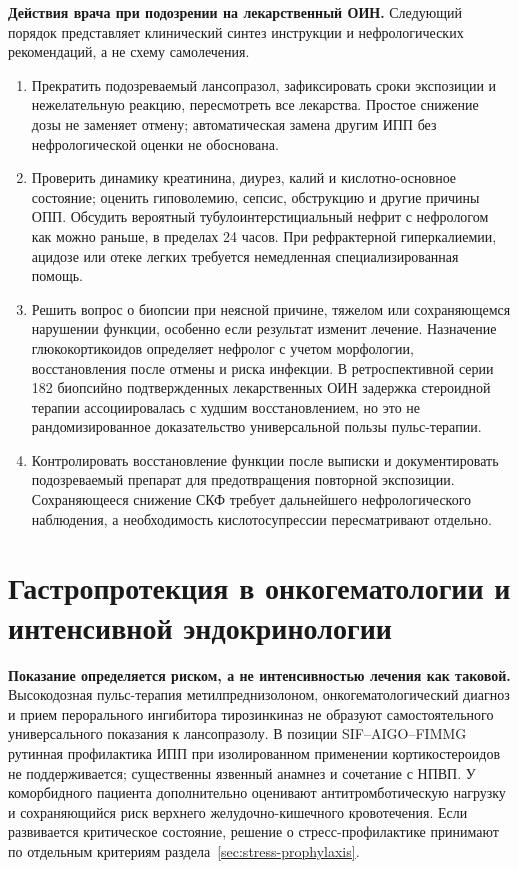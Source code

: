 \documentclass[11pt,a4paper,notitlepage]{report}
\newcommand{\src}[1]{\unskip\space\cite{#1}}
\begin{document}
\textbf{Действия врача при подозрении на лекарственный ОИН.} Следующий порядок представляет клинический синтез инструкции и нефрологических рекомендаций, а не схему самолечения.
\begin{enumerate}
\item Прекратить подозреваемый лансопразол, зафиксировать сроки экспозиции и нежелательную реакцию, пересмотреть все лекарства. Простое снижение дозы не заменяет отмену; автоматическая замена другим ИПП без нефрологической оценки не обоснована.\src{uslabel,renalblank2014}
\item Проверить динамику креатинина, диурез, калий и кислотно-основное состояние; оценить гиповолемию, сепсис, обструкцию и другие причины ОПП. Обсудить вероятный тубулоинтерстициальный нефрит с нефрологом как можно раньше, в пределах 24 часов. При рефрактерной гиперкалиемии, ацидозе или отеке легких требуется немедленная специализированная помощь.\src{renalniceaki}
\item Решить вопрос о биопсии при неясной причине, тяжелом или сохраняющемся нарушении функции, особенно если результат изменит лечение. Назначение глюкокортикоидов определяет нефролог с учетом морфологии, восстановления после отмены и риска инфекции. В ретроспективной серии 182 биопсийно подтвержденных лекарственных ОИН задержка стероидной терапии ассоциировалась с худшим восстановлением, но это не рандомизированное доказательство универсальной пользы пульс-терапии.\src{renaleosin2013,renalsteroids2018}
\item Контролировать восстановление функции после выписки и документировать подозреваемый препарат для предотвращения повторной экспозиции. Сохраняющееся снижение СКФ требует дальнейшего нефрологического наблюдения, а необходимость кислотосупрессии пересматривают отдельно.\src{renalniceaki,uslabel}
\end{enumerate}

\section{Гастропротекция в онкогематологии и интенсивной эндокринологии}
\label{sec:onco-endocrine}
\textbf{Показание определяется риском, а не интенсивностью лечения как таковой.} Высокодозная пульс-терапия метилпреднизолоном, онкогематологический диагноз и прием перорального ингибитора тирозинкиназ не образуют самостоятельного универсального показания к лансопразолу. В позиции SIF--AIGO--FIMMG рутинная профилактика ИПП при изолированном применении кортикостероидов не поддерживается; существенны язвенный анамнез и сочетание с НПВП. У коморбидного пациента дополнительно оценивают антитромботическую нагрузку и сохраняющийся риск верхнего желудочно-кишечного кровотечения. Если развивается критическое состояние, решение о стресс-профилактике принимают по отдельным критериям раздела~\ref{sec:stress-prophylaxis}.\src{oncoppiposition2016,cardioesc2024,sccm}
\end{document}
